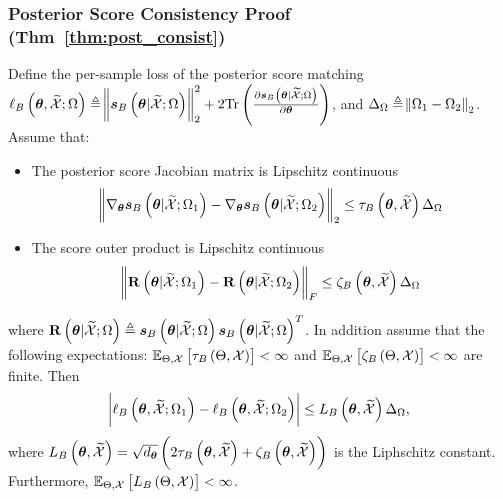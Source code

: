 \subsubsection{Posterior Score Consistency Proof (Thm~\ref{thm:post_consist})}
\label{apx:proof:consistency_post}
\begin{lemma}\label{lemma:lip_score}
 Define the per-sample loss of the posterior score matching $\ell_B\brackets{\p,\xsetr;\Omega}\triangleq{\norm{\postscore{\p}{\xsetr;\Omega}}_2^2}+2\trace{\frac{\partial \postscore{\p}{\xsetr;\Omega}{}}{\partial\p}} $, and $\Delta_\Omega \triangleq  \norm{\Omega_{1}-\Omega_{2}}_2$. 
 Assume that:
  \begin{itemize}
      \item {The posterior} score {Jacobian matrix} is Lipschitz continuous 
      $$\norm{\nabla_{\p}\postscore{\p}{\xsetr;\Omega_1}-\nabla_{\p}\postscore{\p}{\xsetr;\Omega_2}}_2\leq \tau_B\brackets{\p,\xsetr}\Delta_\Omega$$
      \item {The score} outer product is Lipschitz continuous
      $$\norm{\matsym{R}\brackets{\p|\xsetr;\Omega_1}-\matsym{R}\brackets{\p|\xsetr;\Omega_2}}_F\leq \zeta_B\brackets{\p,\xsetr}\Delta_\Omega$$
  \end{itemize}
where $\matsym{R}\brackets{\p|\xsetr;\Omega} \triangleq\postscore{\p}{\xsetr;\Omega}\postscore{\p}{\xsetr;\Omega}^T$.  {In addition assume that the following expectations: $\expectation{\tau_B\brackets{\pr,\xset}}{\pr,\xset}<\infty$ and $\expectation{\zeta_B\brackets{\pr,\xset}}{\pr,\xset}<\infty$ are finite.} Then
    \begin{equation}
        \abs{\ell_B\brackets{\p,\xsetr;\Omega_1}-\ell_B\brackets{\p,\xsetr;\Omega_2}}\leq L_B\brackets{\p,\xsetr}\Delta_\Omega,
    \end{equation}
where 
$L_B\brackets{\p,\xsetr}=\sqrt{\np}\brackets{2\tau_B\brackets{\p,\xsetr}+\zeta_B\brackets{\p,\xsetr}}$ is the Liphschitz constant. {Furthermore, $\expectation{L_B\brackets{\pr,\xset}}{\pr,\xset}<\infty$. }

    
\end{lemma}
